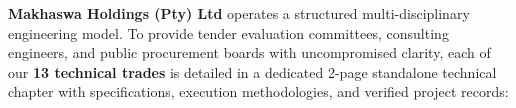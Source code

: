 \hypertarget{sec:capabilities}{}

\noindent
{\fontsize{8.8pt}{12.2pt}\selectfont\color{mhtext}
\textbf{Makhaswa Holdings (Pty) Ltd} operates a structured multi-disciplinary engineering model. To provide tender evaluation committees, consulting engineers, and public procurement boards with uncompromised clarity, each of our \textbf{13 technical trades} is detailed in a dedicated 2-page standalone technical chapter with specifications, execution methodologies, and verified project records:
}

\vspace{0.20cm}

